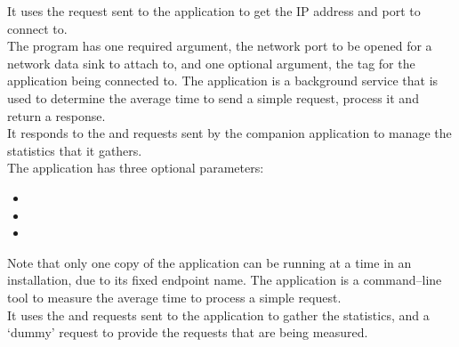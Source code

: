 It uses the  request sent to the
 application to get the IP address and port to connect
to.\\

The program has one required argument, the network port to be opened for a network data
sink to attach to, and one optional argument, the tag for the
 application being connected to.
The  application is a background service that is
used to determine the average time to send a simple request, process it and return a
response.\\

It responds to the  and
 requests sent by the
companion application  to manage the statistics
that it gathers.\\

The application has three optional parameters:
\begin{itemize}
\item {}
\item {}
\item {}
\end{itemize}
Note that only one copy of the  application can be
running at a time in an \mplusm{} installation, due to its fixed endpoint name.
The  application is a command--line tool to
measure the average time to process a simple request.\\

It uses the  and
 requests sent to the
 application to gather the statistics, and a
`dummy' request to provide the requests that are being measured.\\

